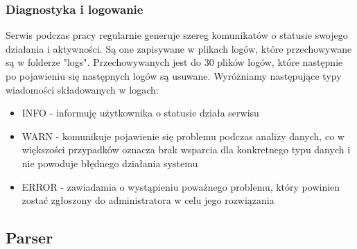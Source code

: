 \documentclass[a4paper]{book}
\begin{document}
\subsubsection{Diagnostyka i logowanie}
Serwis podczas pracy regularnie generuje szereg komunikatów o statusie swojego działania i aktywności.
Są one zapisywane w plikach logów, które przechowywane są w folderze "logs". Przechowywanych jest do 30 plików logów, które następnie po pojawieniu się następnych logów są usuwane.
Wyróżniamy następujące typy wiadomości składowanych w logach:
\begin{itemize}
	\item INFO - informuję użytkownika o statusie działa serwisu
	\item WARN - komunikuje pojawienie się problemu podczas analizy danych, co w większości przypadków oznacza brak wsparcia dla konkretnego typu danych i nie powoduje błędnego działania systemu
	\item ERROR - zawiadamia o wystąpieniu poważnego problemu, który powinien zostać zgłoszony do administratora w celu jego rozwiązania
\end{itemize}
\subsection{Parser}
\end{document}
